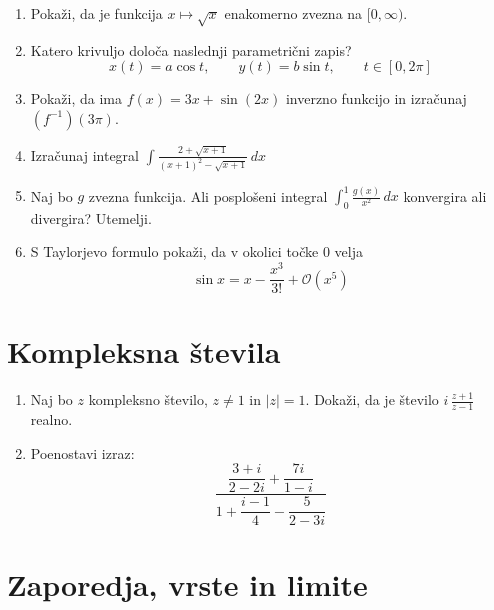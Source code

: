 \documentclass[a4paper,12pt]{article}
\begin{document}
\begin{enumerate}
\item
Pokaži, da je funkcija \(x \mapsto \sqrt{x}\) enakomerno zvezna na \([0,\infty)\).

\item
Katero krivuljo določa naslednji parametrični zapis?
\[
x(t) = a \cos t, \qquad %
y(t) = b \sin t, \qquad %
t \in [0, 2 \pi]
\]

\item
Pokaži, da ima \(f(x)=3x+\sin(2x)\) inverzno funkcijo in izračunaj \((f^{-1})(3\pi)\).

\item
Izračunaj integral
\(\displaystyle
\int \frac{2+\sqrt{x+1}}{(x+1)^2-\sqrt{x+1}} \,dx
\)

\item
Naj bo \(g\) zvezna funkcija. Ali posplošeni integral
\(\int_{0}^{1} \frac{g(x)}{x^2} \,dx\)
konvergira ali divergira? Utemelji.

\item
S Taylorjevo formulo pokaži, da v okolici točke \(0\) velja
\[
\sin x = x - \frac{x^3}{3!} + \mathcal{O}(x^5)
\]
\end{enumerate}

\section*{Kompleksna števila}

\begin{enumerate}
\item
Naj bo \(z\) kompleksno število, \(z \ne 1\) in \(|z|=1\).
Dokaži, da je število \( i \, \frac{z+1}{z-1} \) realno.

\item
Poenostavi izraz:
\[
\frac{\dfrac{3+i}{2-2i}+\dfrac{7i}{1-i}}{1+\dfrac{i-1}{4}-\dfrac{5}{2-3i}}
\]
\end{enumerate}

\section*{Zaporedja, vrste in limite}
\end{document}
